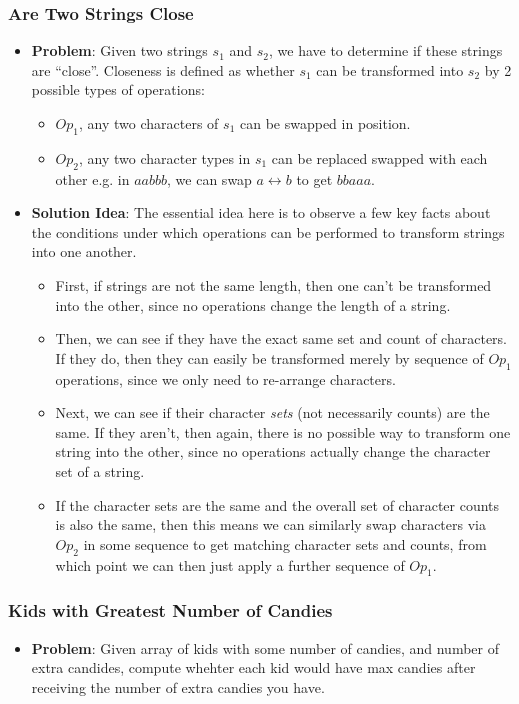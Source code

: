 \documentclass[10pt,a4paper]{article}
\begin{document}
\subsubsection*{Are Two Strings Close}
\begin{itemize}
    \item \textbf{Problem}: Given two strings $s_1$ and $s_2$, we have to determine if these strings are ``close''. Closeness is defined as whether $s_1$ can be transformed into $s_2$ by 2 possible types of operations:
     \begin{itemize}
        \item $Op_1$, any two characters of $s_1$ can be swapped in position.
        \item $Op_2$, any two character types in $s_1$ can be replaced swapped with each other e.g. in $aabbb$, we can swap $a \leftrightarrow b$ to get $bbaaa$.
    \end{itemize}
    \item \textbf{Solution Idea}: The essential idea here is to observe a few key facts about the conditions under which operations can be performed to transform strings into one another.
    \begin{itemize}
        \item First, if strings are not the same length, then one can't be transformed into the other, since no operations change the length of a string. 
        \item Then, we can see if they have the exact same set and count of characters. If they do, then they can easily be transformed merely by sequence of $Op_1$ operations, since we only need to re-arrange characters.
        \item Next, we can see if their character \textit{sets} (not necessarily counts) are the same. If they aren't, then again, there is no possible way to transform one string into the other, since no operations actually change the character set of a string.
        \item If the character sets are the same and the overall set of character counts is also the same, then this means we can similarly swap characters via $Op_2$ in some sequence to get matching character sets and counts, from which point we can then just apply a further sequence of $Op_1$.
    \end{itemize}
    
\end{itemize}

\subsubsection*{Kids with Greatest Number of Candies}
\begin{itemize}
    \item \textbf{Problem}: Given array of kids with some number of candies, and number of extra candides, compute whehter each kid would have max candies after receiving the number of extra candies you have.
\end{itemize}
\end{document}
